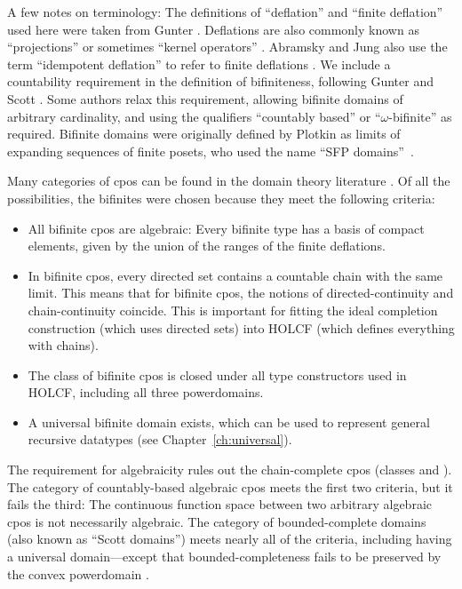 A few notes on terminology: The definitions of ``deflation'' and ``finite deflation'' used here were taken from Gunter \cite[\S3.1]{gunter85thesis}. Deflations are also commonly known as ``projections'' or sometimes ``kernel operators'' \cite{abramsky94domain}. Abramsky and Jung also use the term ``idempotent deflation'' to refer to finite deflations \cite{abramsky94domain}. We include a countability requirement in the definition of bifiniteness, following Gunter and Scott \cite{gunter90semantic}. Some authors \cite{abramsky94domain} relax this requirement, allowing bifinite domains of arbitrary cardinality, and using the qualifiers ``countably based'' or ``$\omega$-bifinite'' as required. Bifinite domains were originally defined by Plotkin as limits of expanding sequences of finite posets, who used the name ``SFP domains''~\cite{plotkin76powerdomain}.

Many categories of cpos can be found in the domain theory literature \cite{amadio+curien, gunter90semantic, abramsky94domain}. Of all the possibilities, the bifinites were chosen because they meet the following criteria:
%
\begin{itemize}
\item All bifinite cpos are algebraic: Every bifinite type has a basis of compact elements, given by the union of the ranges of the finite deflations.
\item In bifinite cpos, every directed set contains a countable chain with the same limit. This means that for bifinite cpos, the notions of directed-continuity and chain-continuity coincide. This is important for fitting the ideal completion construction (which uses directed sets) into HOLCF (which defines everything with chains).
\item The class of bifinite cpos is closed under all type constructors used in HOLCF, including all three powerdomains.
\item A universal bifinite domain exists, which can be used to represent general recursive data\-types (see Chapter~\ref{ch:universal}).
\end{itemize}
%
The requirement for algebraicity rules out the chain-complete cpos (classes  and ). The category of countably-based algebraic cpos meets the first two criteria, but it fails the third: The continuous function space between two arbitrary algebraic cpos is not necessarily algebraic. The category of bounded-complete domains (also known as ``Scott domains'') meets nearly all of the criteria, including having a universal domain---except that bounded-completeness fails to be preserved by the convex powerdomain \cite{gunter90semantic}.

